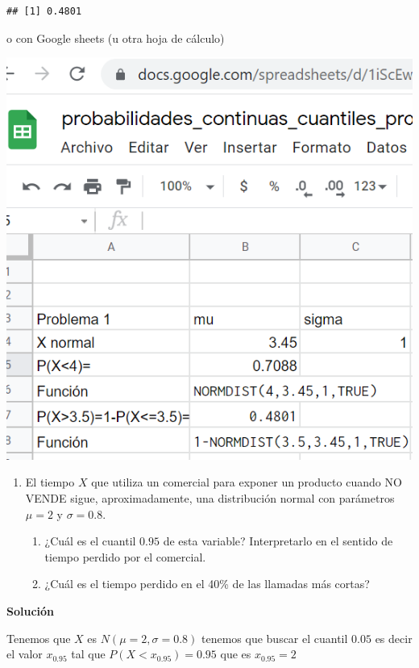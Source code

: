 \documentclass[
]{article}
\providecommand{\tightlist}{%
  \setlength{\itemsep}{0pt}\setlength{\parskip}{0pt}}
\begin{document}
\begin{verbatim}
## [1] 0.4801
\end{verbatim}

o con Google sheets (u otra hoja de cálculo)

\includegraphics[width=7.76in]{pro1_cont_1}

\newpage

\begin{enumerate}
\def\labelenumi{\arabic{enumi}.}
\setcounter{enumi}{1}
\tightlist
\item
  El tiempo \(X\) que utiliza un comercial para exponer un producto
  cuando NO VENDE sigue, aproximadamente, una distribución normal con
  parámetros \(\mu=2\) y \(\sigma=0.8\).

  \begin{enumerate}
  \def\labelenumii{\alph{enumii}.}
  \tightlist
  \item
    ¿Cuál es el cuantil \(0.95\) de esta variable? Interpretarlo en el
    sentido de tiempo perdido por el comercial.
  \item
    ¿Cuál es el tiempo perdido en el 40\% de las llamadas más cortas?
  \end{enumerate}
\end{enumerate}

\textbf{Solución}

Tenemos que \(X\) es \(N(\mu=2,\sigma=0.8)\) tenemos que buscar el
cuantil \(0.05\) es decir el valor \(x_{0.95}\) tal que
\(P(X <x_{0.95})=0.95\) que es \(x_{0.95}=2\)
\end{document}
